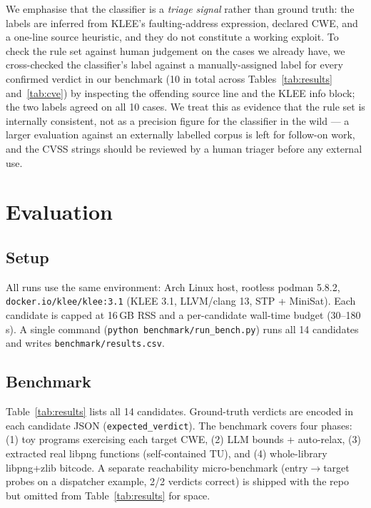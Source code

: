 \documentclass[3p,times,procedia]{elsarticle}
\begin{document}
We emphasise that the classifier is a \emph{triage signal} rather than ground truth: the labels are inferred from KLEE's faulting-address expression, declared CWE, and a one-line source heuristic, and they do not constitute a working exploit. To check the rule set against human judgement on the cases we already have, we cross-checked the classifier's label against a manually-assigned label for every confirmed verdict in our benchmark (10 in total across Tables~\ref{tab:results} and~\ref{tab:cve}) by inspecting the offending source line and the KLEE info block; the two labels agreed on all 10 cases. We treat this as evidence that the rule set is internally consistent, not as a precision figure for the classifier in the wild --- a larger evaluation against an externally labelled corpus is left for follow-on work, and the CVSS strings should be reviewed by a human triager before any external use.

\section{Evaluation}
\label{sec:eval}

\subsection{Setup}

All runs use the same environment: Arch Linux host, rootless podman 5.8.2, \texttt{docker.io/klee/klee:3.1} (KLEE 3.1, LLVM/clang 13, STP + MiniSat). Each candidate is capped at 16\,GB RSS and a per-candidate wall-time budget (30--180\,s). A single command (\texttt{python benchmark/run\_bench.py}) runs all 14 candidates and writes \texttt{benchmark/results.csv}.

\subsection{Benchmark}

Table~\ref{tab:results} lists all 14 candidates. Ground-truth verdicts are encoded in each candidate JSON (\texttt{expected\_verdict}). The benchmark covers four phases: (1) toy programs exercising each target CWE, (2) LLM bounds + auto-relax, (3) extracted real libpng functions (self-contained TU), and (4) whole-library libpng+zlib bitcode. A separate reachability micro-benchmark (entry$\to$target probes on a dispatcher example, 2/2 verdicts correct) is shipped with the repo but omitted from Table~\ref{tab:results} for space.
\end{document}
